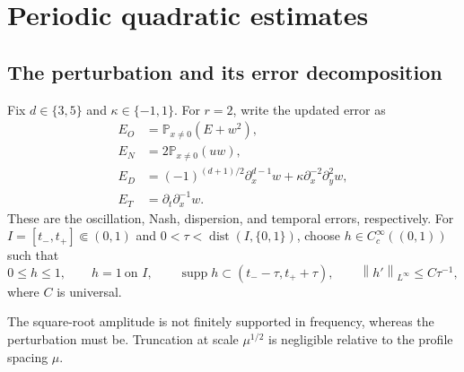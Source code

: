 \documentclass[12pt,reqno,letterpaper]{amsart}
\numberwithin{equation}{section}
\theoremstyle{definition}
\newcommand{\supp}{\operatorname{supp}}
\newcommand{\norm}[1]{\left\lVert #1\right\rVert}
\begin{document}
\section{Periodic quadratic estimates}


\subsection{The perturbation and its error decomposition}

Fix $d\in\{3,5\}$ and $\kappa\in\{-1,1\}$.  For $r=2$, write the updated
error as
\begin{align}
    E_O&=\mathbb P_{x\neq0}(E+w^2),\label{eq:RO}\\
    E_N&=2\mathbb P_{x\neq0}(uw),\label{eq:RN}\\
    E_D&=(-1)^{(d+1)/2}\partial_x^{d-1}w
       +\kappa\partial_x^{-2}\partial_y^2w,\label{eq:RD}\\
    E_T&=\partial_t\partial_x^{-1}w.\label{eq:RT}
\end{align}
These are the oscillation, Nash, dispersion, and temporal errors,
respectively.
For $I=[t_-,t_+]\Subset(0,1)$ and
$0<\tau<\operatorname{dist}(I,\{0,1\})$, choose
$h\in C_c^\infty((0,1))$ such that
\begin{equation}\label{eq:time-cutoff-lemma}
   0\leq h\leq1,
   \qquad h=1\ \text{on }I,
   \qquad \supp h\subset(t_--\tau,t_++\tau),
   \qquad \norm{h'}_{L^\infty}\leq C\tau^{-1},
\end{equation}
where $C$ is universal.

The square-root amplitude is not finitely supported in frequency, whereas
the perturbation must be.  Truncation at scale $\mu^{1/2}$ is negligible
relative to the profile spacing $\mu$.
\end{document}
